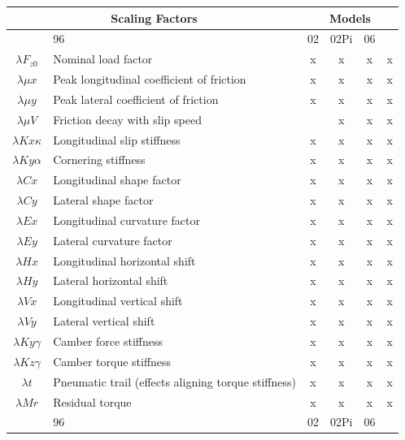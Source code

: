 \begin{center}
\begin{longtable}[c]{|c|p{4in}|cccc|}
	\hline
			
			\multicolumn{2}{|c|}{\cellcolor{tblue}\textbf{Scaling Factors}}&\multicolumn{4}{|c|}{\cellcolor{tblue}\textbf{Models}} \\ \hline
			\rowcolor{ttblue}\multicolumn{2}{|c|}{\cellcolor{ttblue}\textbf{Pure Slip}}&96&	02&	02Pi&	06 \\ \hline
			$\lambda F_{z0}$ &Nominal load factor	&x	&x	&x	&x\\ \hline
			$\lambda \mu x$	&Peak longitudinal coefficient of friction	&x	&x &x	&x\\ \hline
			$\lambda \mu y$	&Peak lateral coefficient of friction	&x	&x &x	&x\\ \hline
			$\lambda \mu V$	&Friction decay with slip speed 		&&x	&x &x\\ \hline
			$\lambda Kx\kappa$	&Longitudinal slip stiffness	&x	&x &x	&x\\ \hline
			$\lambda Ky \alpha$	&Cornering stiffness 	&x	&x &x	&x\\ \hline
			$\lambda Cx$	&Longitudinal shape factor	&x	&x &x	&x\\ \hline
			$\lambda Cy$	&Lateral shape factor	&x	&x	&x &x\\ \hline
			$\lambda Ex$	&Longitudinal curvature factor	&x &x	&x	&x\\ \hline
			$\lambda Ey$	&Lateral curvature factor	&x	&x	&x &x\\ \hline
			$\lambda Hx$	&Longitudinal horizontal shift 	&x	&x &x	&x\\ \hline
			$\lambda Hy$	&Lateral horizontal shift 	&x	&x	&x &x\\ \hline
			$\lambda Vx$	&Longitudinal vertical shift	&x	&x	&x	&x\\ \hline
			$\lambda Vy$	&Lateral vertical shift	&x	&x &x	&x	\\ \hline
			$\lambda Ky \gamma$	&Camber force stiffness 	&x	&x &x	&x\\ \hline
			$\lambda Kz \gamma$	&Camber torque stiffness 	&x	&x &x	&x\\ \hline
			$\lambda t$	&Pneumatic trail (effects aligning torque stiffness) 	&x &x	&x	&x\\ \hline
			$\lambda Mr$	&Residual torque 	&x	&x &x	&x\\ \hline
			\rowcolor{ttblue}\multicolumn{2}{|c|}{\cellcolor{ttblue}\textbf{Combined Slip}}&96&	02& 02Pi&	06 \\ \hline					

\end{longtable}
\end{center}
